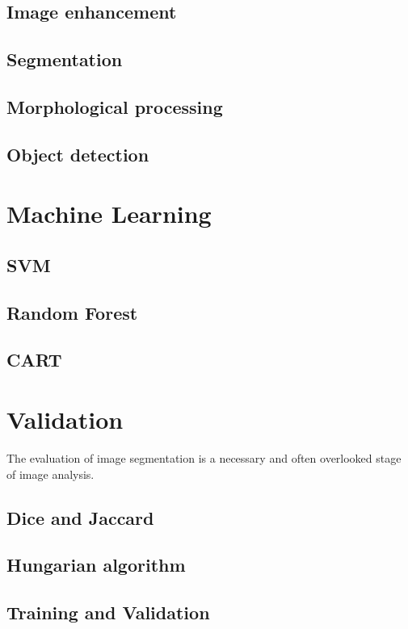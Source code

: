 \subsection{Image enhancement}
\subsection{Segmentation}
\subsection{Morphological processing}
\subsection{Object detection}

\section{Machine Learning}
\subsection{SVM}
\subsection{Random Forest}
\subsection{CART}

\section{Validation}
The evaluation of image segmentation is a necessary and often overlooked stage of image analysis.
\subsection{Dice and Jaccard}
\subsection{Hungarian algorithm}
\subsection{Training and Validation}

